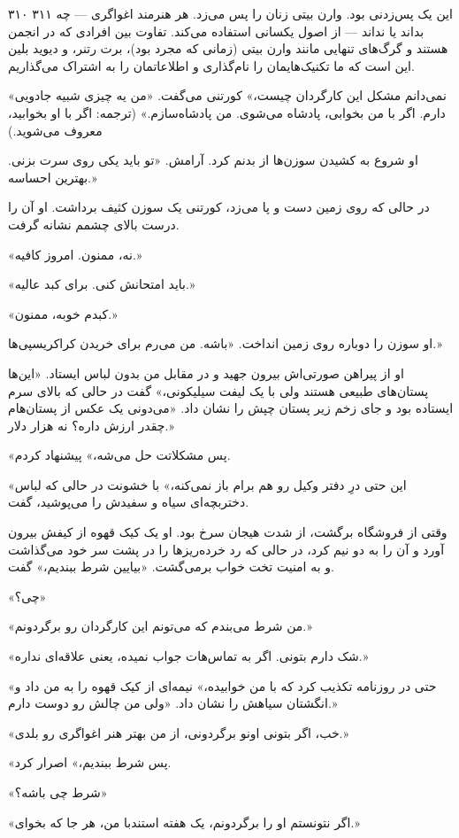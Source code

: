 ۳۱۰  ۳۱۱  این یک پس‌زدنی بود. وارن بیتی زنان را پس می‌زد. هر هنرمند اغواگری — چه بداند یا نداند — از اصول یکسانی استفاده می‌کند. تفاوت بین افرادی که در انجمن هستند و گرگ‌های تنهایی مانند وارن بیتی (زمانی که مجرد بود)، برت رتنر، و دیوید بلین این است که ما تکنیک‌هایمان را نام‌گذاری و اطلاعاتمان را به اشتراک می‌گذاریم. 

«نمی‌دانم مشکل این کارگردان چیست،» کورتنی می‌گفت. «من یه چیزی شبیه جادویی دارم. اگر با من بخوابی، پادشاه می‌شوی. من پادشاه‌سازم.» (ترجمه: اگر با او بخوابید، معروف می‌شوید.)

او شروع به کشیدن سوزن‌ها از بدنم کرد. آرامش. «تو باید یکی روی سرت بزنی. بهترین احساسه.»

در حالی که روی زمین دست و پا می‌زد، کورتنی یک سوزن کثیف برداشت. او آن را درست بالای چشمم نشانه گرفت.

«نه، ممنون. امروز کافیه.»

«باید امتحانش کنی. برای کبد عالیه.»

«کبدم خوبه، ممنون.»

او سوزن را دوباره روی زمین انداخت. «باشه. من می‌رم برای خریدن کراکریسپی‌ها.»

او از پیراهن صورتی‌اش بیرون جهید و در مقابل من بدون لباس ایستاد. «این‌ها پستان‌های طبیعی هستند ولی با یک لیفت سیلیکونی،» گفت در حالی که بالای سرم ایستاده بود و جای زخم زیر پستان چپش را نشان داد. «می‌دونی یک عکس از پستان‌هام چقدر ارزش داره؟ نه هزار دلار.»

«پس مشکلاتت حل می‌شه،» پیشنهاد کردم.

«این حتی درِ دفتر وکیل رو هم برام باز نمی‌کنه،» با خشونت در حالی که لباس دختربچه‌ای سیاه و سفیدش را می‌پوشید، گفت.

وقتی از فروشگاه برگشت، از شدت هیجان سرخ بود. او یک کیک قهوه از کیفش بیرون آورد و آن را به دو نیم کرد، در حالی که رد خرده‌ریزها را در پشت سر خود می‌گذاشت و به امنیت تخت خواب برمی‌گشت. «بیایین شرط ببندیم،» گفت.

«چی؟»

«من شرط می‌بندم که می‌تونم این کارگردان رو برگردونم.»

«شک دارم بتونی. اگر به تماس‌هات جواب نمیده، یعنی علاقه‌ای نداره.»

«حتی در روزنامه تکذیب کرد که با من خوابیده،» نیمه‌ای از کیک قهوه را به من داد و انگشتان سیاهش را نشان داد. «ولی من چالش رو دوست دارم.»

«خب، اگر بتونی اونو برگردونی، از من بهتر هنر اغواگری رو بلدی.»

«پس شرط ببندیم،» اصرار کرد.

«شرط چی باشه؟»

«اگر نتونستم او را برگردونم، یک هفته استندبا من، هر جا که بخوای.»